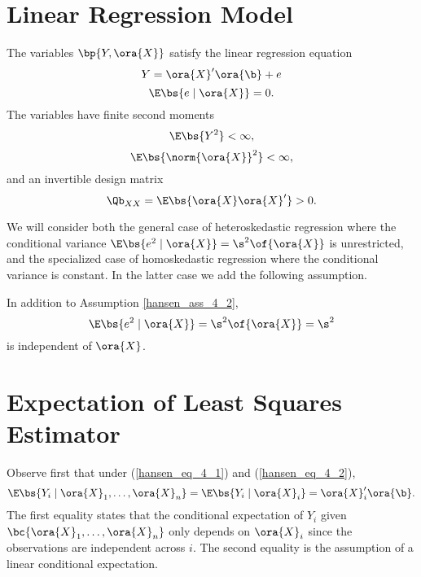 \section{Linear Regression Model}

\begin{assumption} 
    \label{hansen_ass_4_2}

    The variables $\bp{Y, \ora{X}}$ satisfy the linear regression equation
    \begin{equation} 
        \label{hansen_eq_4_1}
        Y = \ora{X}^\prime \ora{\b} + e
    \end{equation}
    \begin{equation} \label{hansen_eq_4_2}
        \E\bs{e \mid \ora{X}} = 0.
    \end{equation}
    The variables have finite second moments
    $$\E\bs{Y^2} < \infty,$$
    $$\E\bs{\norm{\ora{X}}^2} < \infty,$$
    and an invertible design matrix
    $$\Qb_{XX} = \E\bs{\ora{X} \ora{X}^\prime} > 0.$$
\end{assumption}

We will consider both the general case of heteroskedastic regression where the conditional variance $\E\bs{e^2 \mid \ora{X}} = \s^2\of{\ora{X}}$ is unrestricted, and the specialized case of homoskedastic regression where the conditional variance is constant. In the latter case we add the following assumption.

\begin{assumption} 
    \label{hansen_ass_4_3}

    In addition to Assumption \ref{hansen_ass_4_2}, 
    \begin{equation}  \label{hansen_eq_4_3}
        \E\bs{e^2 \mid \ora{X}} = \s^2\of{\ora{X}} = \s^2
    \end{equation}
    is independent of $\ora{X}$.
\end{assumption}

\section{Expectation of Least Squares Estimator}

Observe first that under (\ref{hansen_eq_4_1}) and (\ref{hansen_eq_4_2}),
\begin{equation} \label{hansen_eq_4_4}
    \E\bs{Y_i \mid \ora{X}_1, \ldots, \ora{X}_n} = \E\bs{Y_i \mid \ora{X}_i} = \ora{X}_i^\prime \ora{\b}.
\end{equation}
The first equality states that the conditional expectation of $Y_i$ given $\bc{\ora{X}_1, \ldots, \ora{X}_n}$ only depends on $\ora{X}_i$ since the observations are independent across $i$. The second equality is the assumption of a linear conditional expectation.


